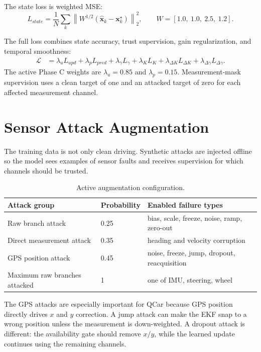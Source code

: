 \documentclass[11pt,a4paper]{article}
\newcommand{\state}{\bm{x}}
\begin{document}
The state loss is weighted MSE:
\begin{equation}
  L_{state}
  =
  \frac{1}{N}\sum_k
  \left\|
  W^{1/2}(\hat{\state}_k-\state_k^\star)
  \right\|_2^2,
  \qquad
  W=[1.0,\ 1.0,\ 2.5,\ 1.2].
\end{equation}

The full loss combines state accuracy, trust supervision, gain regularization,
and temporal smoothness:
\begin{equation}
\begin{aligned}
  \mathcal{L}
  &=
  \lambda_u L_{upd}
  + \lambda_p L_{pred}
  + \lambda_{\gamma} L_{\gamma}
  + \lambda_K L_K
  + \lambda_{\Delta K} L_{\Delta K}
  + \lambda_{\Delta\gamma} L_{\Delta\gamma}.
\end{aligned}
\end{equation}
The active Phase C weights are $\lambda_u=0.85$ and $\lambda_p=0.15$.
Measurement-mask supervision uses a clean target of one and an attacked target
of zero for each affected measurement channel.

\section{Sensor Attack Augmentation}

The training data is not only clean driving. Synthetic attacks are injected
offline so the model sees examples of sensor faults and receives supervision
for which channels should be trusted.

\begin{table}[htbp]
\centering
\caption{Active augmentation configuration.}
\label{tab:augmentation}
\begin{tabular}{lll}
\toprule
Attack group & Probability & Enabled failure types \\
\midrule
Raw branch attack & 0.25 & bias, scale, freeze, noise, ramp, zero-out \\
Direct measurement attack & 0.35 & heading and velocity corruption \\
GPS position attack & 0.45 & noise, freeze, jump, dropout, reacquisition \\
Maximum raw branches attacked & 1 & one of IMU, steering, wheel \\
\bottomrule
\end{tabular}
\end{table}

The GPS attacks are especially important for QCar because GPS position directly
drives $x$ and $y$ correction. A jump attack can make the EKF snap to a wrong
position unless the measurement is down-weighted. A dropout attack is different:
the availability gate should remove $x/y$, while the learned update continues
using the remaining channels.
\end{document}
